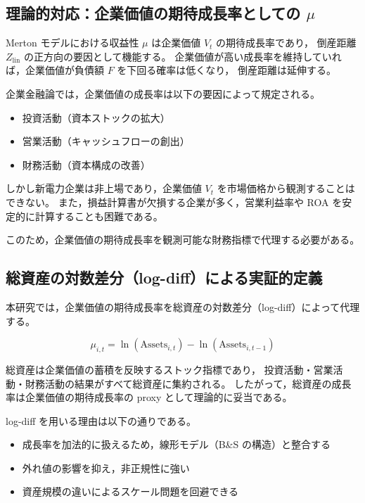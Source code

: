 \subsection{理論的対応：企業価値の期待成長率としての $\mu$}

Merton モデルにおける収益性 $\mu$ は企業価値 $V_t$ の期待成長率であり，
倒産距離 $Z_{\text{lin}}$ の正方向の要因として機能する。
企業価値が高い成長率を維持していれば，企業価値が負債額 $F$ を下回る確率は低くなり，
倒産距離は延伸する。

企業金融論では，企業価値の成長率は以下の要因によって規定される。

\begin{itemize}
    \item 投資活動（資本ストックの拡大）
    \item 営業活動（キャッシュフローの創出）
    \item 財務活動（資本構成の改善）
\end{itemize}

しかし新電力企業は非上場であり，企業価値 $V_t$ を市場価格から観測することはできない。
また，損益計算書が欠損する企業が多く，営業利益率や ROA を安定的に計算することも困難である。

このため，企業価値の期待成長率を観測可能な財務指標で代理する必要がある。

\subsection{総資産の対数差分（log-diff）による実証的定義}

本研究では，企業価値の期待成長率を総資産の対数差分（log-diff）によって代理する。



\[
\mu_{i,t}
= \ln(\mathrm{Assets}_{i,t}) - \ln(\mathrm{Assets}_{i,t-1})
\]



総資産は企業価値の蓄積を反映するストック指標であり，
投資活動・営業活動・財務活動の結果がすべて総資産に集約される。
したがって，総資産の成長率は企業価値の期待成長率の proxy として理論的に妥当である。

log-diff を用いる理由は以下の通りである。

\begin{itemize}
    \item 成長率を加法的に扱えるため，線形モデル（B\&S の構造）と整合する
    \item 外れ値の影響を抑え，非正規性に強い
    \item 資産規模の違いによるスケール問題を回避できる
\end{itemize}

